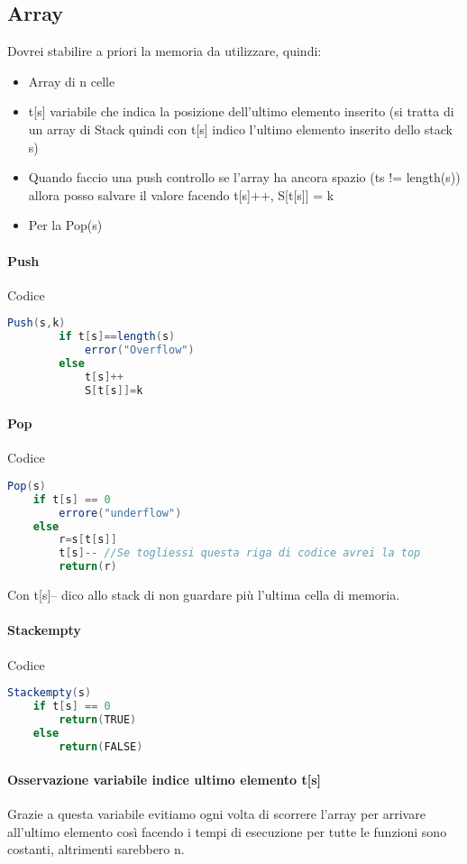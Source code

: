 \subsection{Array}
Dovrei stabilire a priori la memoria da utilizzare, quindi:
\begin{itemize}
    \item Array di n celle
    \item t[s] variabile che indica la posizione dell'ultimo elemento inserito (si tratta di un array di Stack quindi con t[s] indico l'ultimo
    elemento inserito dello stack s)
    \item Quando faccio una push controllo se l'array ha ancora spazio (t{s} != length(s)) allora
    posso salvare il valore facendo t[s]++, S[t[s]] = k
    \item Per la Pop(s)
\end{itemize}
\paragraph*{Push} Codice
\begin{lstlisting}[language=Java]
    Push(s,k)
        if t[s]==length(s)
            error("Overflow")
        else
            t[s]++
            S[t[s]]=k
\end{lstlisting}
\paragraph*{Pop} Codice
\begin{lstlisting}[language=Java]
    Pop(s)
    if t[s] == 0
        errore("underflow")
    else
        r=s[t[s]]
        t[s]-- //Se togliessi questa riga di codice avrei la top
        return(r)
\end{lstlisting}
Con t[s]-- dico allo stack di non guardare più l'ultima cella di memoria.
\paragraph*{Stackempty} Codice
\begin{lstlisting}[language=Java]
    Stackempty(s)
    if t[s] == 0
        return(TRUE)
    else
        return(FALSE)
\end{lstlisting}
\paragraph*{Osservazione variabile indice ultimo elemento t[s]} Grazie a questa variabile
evitiamo ogni volta di scorrere l'array per arrivare all'ultimo elemento così facendo
i tempi di esecuzione per tutte le funzioni sono costanti, altrimenti sarebbero n.
